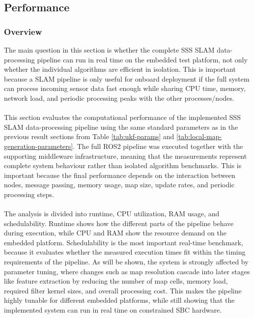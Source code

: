 \subsection{Performance}
\subsubsection{Overview}
The main question in this section is whether the complete SSS SLAM data-processing pipeline can run in real time on the embedded test platform, not only whether the individual algorithms are efficient in isolation. This is important because a SLAM pipeline is only useful for onboard deployment if the full system can process incoming sensor data fast enough while sharing CPU time, memory, network load, and periodic processing peaks with the other processes/nodes.
\\ \\
This section evaluates the computational performance of the implemented SSS SLAM data-processing pipeline using the same standard parameters as in the previous result sections from Table \ref{tab:ukf-params} and \ref{tab:local-map-generation-parameters}. The full ROS2 pipeline was executed together with the supporting middleware infrastructure, meaning that the measurements represent complete system behaviour rather than isolated algorithm benchmarks. This is important because the final performance depends on the interaction between nodes, message passing, memory usage, map size, update rates, and periodic processing steps.
\\ \\
The analysis is divided into runtime, CPU utilization, RAM usage, and schedulability. Runtime shows how the different parts of the pipeline behave during execution, while CPU and RAM show the resource demand on the embedded platform. Schedulability is the most important real-time benchmark, because it evaluates whether the measured execution times fit within the timing requirements of the pipeline. As will be shown, the system is strongly affected by parameter tuning, where changes such as map resolution cascade into later stages like feature extraction by reducing the number of map cells, memory load, required filter kernel sizes, and overall processing cost. This makes the pipeline highly tunable for different embedded platforms, while still showing that the implemented system can run in real time on constrained SBC hardware.



\newpage



